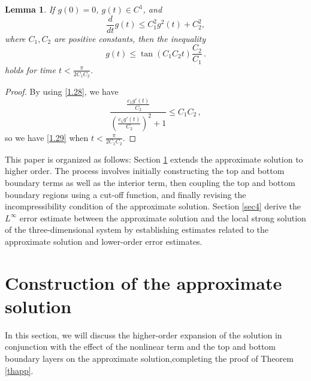 \documentclass[pdflatex,sn-mathphys-num]{sn-jnl}%
\theoremstyle{thmstyleone}%
\theoremstyle{thmstyletwo}%
\theoremstyle{thmstylethree}%
\theoremstyle{thmstyletwo}
\newtheorem{lemma}{Lemma}
\begin{document}
\begin{lemma}\label{f4}
	If \( g(0) = 0 \), \( g(t) \in C^1 \), and   
	\begin{equation}\label{1.28}
		\frac{d}{dt}g(t) \leq C_1^2 g^2(t) + C_2^2,
	\end{equation}
	where \( C_1, C_2 \) are positive constants, then the inequality 
	\begin{equation}\label{1.29}
		g(t) \leq \tan(C_1 C_2 t) \frac{C_2}{C_1}\,.
	\end{equation}
	holds for time  $t< \frac{\pi}{2C_1 C_2}$.
\end{lemma}
\begin{proof}
	By using \eqref{1.28}, we have
	\begin{equation*}
		\frac{\frac{c_1 g'(t)}{C_2}}{(\frac{c_1 g'(t)}{C_2})^2+1} \leq C_1  C_2\,,
	\end{equation*}
	so we have \eqref{1.29} when $t< \frac{\pi}{2C_1 C_2}$.
\end{proof}


This paper is organized as follows: 
Section \ref{sec2} extends the approximate solution to higher order. The process involves initially constructing the top and bottom boundary terms as well as the interior term, then coupling the top and bottom boundary regions using a cut-off function, and finally revising the incompressibility condition of the approximate solution. Section \ref{sec4} derive the $L^\infty$ error estimate between the approximate solution and the local strong solution of the three-dimensional system by establishing estimates related to the approximate solution and lower-order error estimates.



\section{Construction of the approximate solution}\label{sec2}
In this section, we will discuss the higher-order expansion of the solution in conjunction with the effect of the nonlinear term and the top and bottom boundary layers on the approximate solution,completing the proof of Theorem \ref{thapp}.
\end{document}
